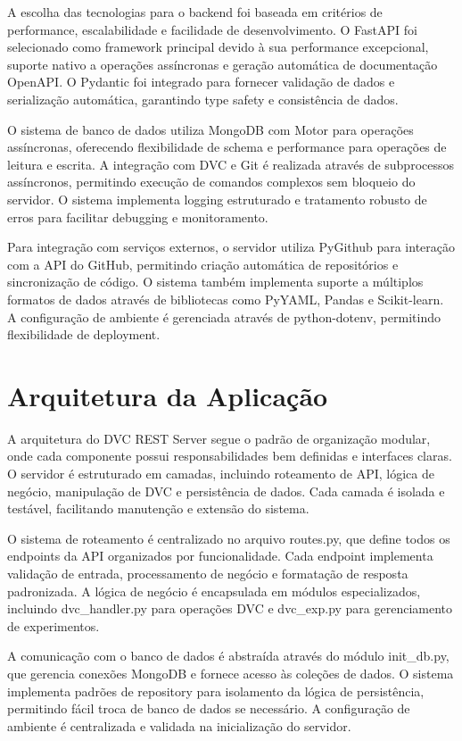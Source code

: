\documentclass[12pt,a4paper]{article}
\begin{document}
A escolha das tecnologias para o backend foi baseada em critérios de performance, escalabilidade e facilidade de desenvolvimento. O FastAPI foi selecionado como framework principal devido à sua performance excepcional, suporte nativo a operações assíncronas e geração automática de documentação OpenAPI. O Pydantic foi integrado para fornecer validação de dados e serialização automática, garantindo type safety e consistência de dados.

O sistema de banco de dados utiliza MongoDB com Motor para operações assíncronas, oferecendo flexibilidade de schema e performance para operações de leitura e escrita. A integração com DVC e Git é realizada através de subprocessos assíncronos, permitindo execução de comandos complexos sem bloqueio do servidor. O sistema implementa logging estruturado e tratamento robusto de erros para facilitar debugging e monitoramento.

Para integração com serviços externos, o servidor utiliza PyGithub para interação com a API do GitHub, permitindo criação automática de repositórios e sincronização de código. O sistema também implementa suporte a múltiplos formatos de dados através de bibliotecas como PyYAML, Pandas e Scikit-learn. A configuração de ambiente é gerenciada através de python-dotenv, permitindo flexibilidade de deployment.

\section{Arquitetura da Aplicação}

A arquitetura do DVC REST Server segue o padrão de organização modular, onde cada componente possui responsabilidades bem definidas e interfaces claras. O servidor é estruturado em camadas, incluindo roteamento de API, lógica de negócio, manipulação de DVC e persistência de dados. Cada camada é isolada e testável, facilitando manutenção e extensão do sistema.

O sistema de roteamento é centralizado no arquivo routes.py, que define todos os endpoints da API organizados por funcionalidade. Cada endpoint implementa validação de entrada, processamento de negócio e formatação de resposta padronizada. A lógica de negócio é encapsulada em módulos especializados, incluindo dvc_handler.py para operações DVC e dvc_exp.py para gerenciamento de experimentos.

A comunicação com o banco de dados é abstraída através do módulo init_db.py, que gerencia conexões MongoDB e fornece acesso às coleções de dados. O sistema implementa padrões de repository para isolamento da lógica de persistência, permitindo fácil troca de banco de dados se necessário. A configuração de ambiente é centralizada e validada na inicialização do servidor.
\end{document}
